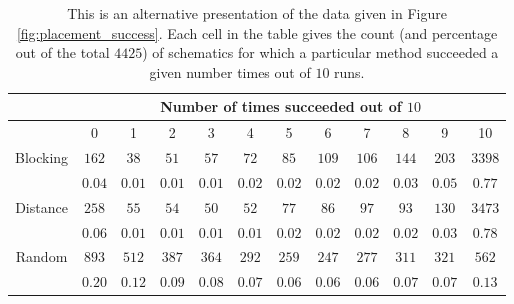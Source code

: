 \begin{table}[H]
\begin{center}
\begin{singlespace}
\begin{tabular}{|c||c|c|c|c|c|c|c|c|c|c|c|}
\hline
 & \multicolumn{11}{|c|}{Number of times succeeded out of $10$} \\
\hline
 & 0 & 1 & 2 & 3 & 4 & 5 & 6 & 7 & 8 & 9 & 10 \\
\hline\hline
Blocking & $162$ & $38$ & $51$ & $57$ & $72$ & $85$ & $109$ & $106$ & $144$ & $203$ & $3398$ \\
 & $0.04$ & $0.01$ & $0.01$ & $0.01$ & $0.02$ & $0.02$ & $0.02$ & $0.02$ & $0.03$ & $0.05$ & $0.77$ \\
\hline
 Distance & $258$ & $55$ & $54$ & $50$ & $52$ & $77$ & $86$ & $97$ & $93$ & $130$ & $3473$ \\
  & $0.06$ & $0.01$ & $0.01$ & $0.01$ & $0.01$ & $0.02$ & $0.02$ & $0.02$ & $0.02$ & $0.03$ & $0.78$ \\
\hline
  Random & $893$ & $512$ & $387$ & $364$ & $292$ & $259$ & $247$ & $277$ & $311$ & $321$ & $562$ \\
   & $0.20$ & $0.12$ & $0.09$ & $0.08$ & $0.07$ & $0.06$ & $0.06$ & $0.06$ & $0.07$ & $0.07$ & $0.13$ \\
\hline
\end{tabular}
\end{singlespace}
\end{center}
\label{tb:placement_success}
\caption[Placement method success rate comparison]{This is an alternative
presentation of the data given in Figure \ref{fig:placement_success}. Each cell
in the table gives the count (and percentage out of the total $4425$)
of schematics for which a
particular method succeeded a given number times out of $10$ runs.}
\end{table}

